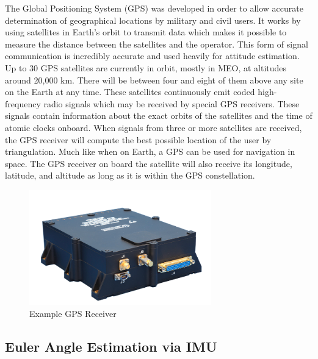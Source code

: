 \documentclass{article}
\begin{document}
The Global Positioning System (GPS) was developed in order to allow
accurate determination of geographical locations by military and civil
users. It works by using satellites in Earth’s orbit to transmit data
which makes it possible to measure the distance between the satellites
and the operator. This form of signal communication is incredibly
accurate and used heavily for attitude estimation. Up to 30 GPS
satellites are currently in orbit, mostly in MEO, at altitudes around
20,000 km. There will be between four and eight of them above any site
on the Earth at any time\cite{qp38}. These satellites continuously emit
coded high-frequency radio signals which may be received by special
GPS receivers. These signals contain information about the exact
orbits of the satellites and the time of atomic clocks onboard. When
signals from three or more satellites are received, the GPS receiver
will compute the best possible location of the user by
triangulation. Much like when on Earth, a GPS can be used for
navigation in space. The GPS receiver on board the satellite will also
receive its longitude, latitude, and altitude as long as it is within
the GPS constellation.
\begin{figure}[H]
  \begin{center}
  \includegraphics[height=50mm]{Figures/GPS}
  \end{center}
  \caption{Example GPS Receiver \cite{qp32}}
\end{figure}

\subsection{Euler Angle Estimation via IMU}
\end{document}
